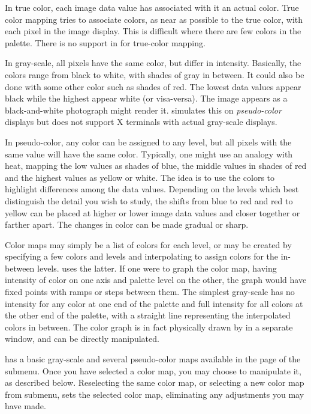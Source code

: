 In true color, each image data value has associated with it an actual
color.  True color mapping tries to associate colors, as near as possible
to the true color, with each pixel in the image display.  This is
difficult where there are few colors in the palette.  There is no support
in {\SAO} for true-color mapping.

In gray-scale, all pixels have the same color, but differ in intensity.
Basically, the colors range from black to white, with shades of gray in
between.  It could also be done with some other color such as shades of
red.  The lowest data values appear black while the highest appear white
(or visa-versa).  The image appears as a black-and-white photograph might
render it.  {\SAO} simulates this on {\em pseudo-color} displays
but does not support X terminals with actual gray-scale displays.

In pseudo-color, any color can be assigned to any level, but all pixels
with the same value will have the same color.  Typically, one might use
an analogy with heat, mapping the low values as shades of blue, the middle
values in shades of red and the highest values as yellow or white.  The
idea is to use the colors to highlight differences among the data values.
Depending on the levels which best distinguish the detail you wish to
study, the shifts from blue to red and red to yellow can be placed at
higher or lower image data values and closer together or farther apart.
The changes in color can be made gradual or sharp.

Color maps may simply be a list of colors for each level, or may be
created by specifying a few colors and levels and interpolating to
assign colors for the in-between levels.  {\SAO} uses the latter.
If one were to graph the color map, having intensity of color on one
axis and palette level on the other, the graph would have fixed points
with ramps or steps between them.  The simplest gray-scale has no
intensity for any color at one end of the palette and full intensity
for all colors at the other end of the palette, with a straight line
representing the interpolated colors in between.  The color graph is
in fact physically drawn by {\SAO} in a separate window, and can be
directly manipulated.

{\SAO} has a basic gray-scale and several pseudo-color maps available
in the  page of the  submenu.  Once you have selected a
color map, you may choose to manipulate it, as described below.
Reselecting the same color map, or selecting a new color map from
 submenu, sets the selected color map, eliminating any
adjustments you may have made.

